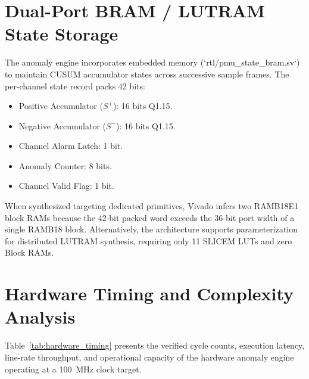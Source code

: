 \documentclass[12pt,a4paper]{report}
\begin{document}
\section{Dual-Port BRAM / LUTRAM State Storage}
The anomaly engine incorporates embedded memory (`rtl/pmu_state_bram.sv`) to maintain CUSUM
accumulator states across successive sample frames. The per-channel state record packs 42 bits:
\begin{itemize}
    \item Positive Accumulator ($S^+$): 16 bits Q1.15.
    \item Negative Accumulator ($S^-$): 16 bits Q1.15.
    \item Channel Alarm Latch: 1 bit.
    \item Anomaly Counter: 8 bits.
    \item Channel Valid Flag: 1 bit.
\end{itemize}
When synthesized targeting dedicated primitives, Vivado infers two RAMB18E1 block RAMs because
the 42-bit packed word exceeds the 36-bit port width of a single RAMB18 block. Alternatively,
the architecture supports parameterization for distributed LUTRAM synthesis, requiring only
11 SLICEM LUTs and zero Block RAMs.

\section{Hardware Timing and Complexity Analysis}
Table~\ref{tab:hardware_timing} presents the verified cycle counts, execution latency,
line-rate throughput, and operational capacity of the hardware anomaly engine operating at
a 100~MHz clock target.
\end{document}
